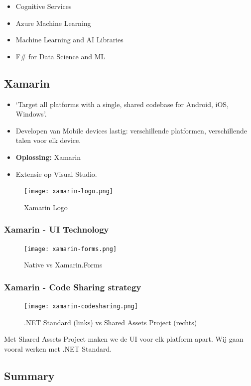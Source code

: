 \documentclass{article}
\newcommand{\bold}[1]{\textbf{#1}}
\begin{document}
\begin{itemize}
    \item Cognitive Services
    \item Azure Machine Learning
    \item Machine Learning and AI Libraries
    \item F\# for Data Science and ML
\end{itemize}

\subsection{Xamarin}
\begin{itemize}
    \item `Target all platforms with a single, shared codebase for Android, iOS, Windows'. 
    \item Developen van Mobile devices lastig: verschillende platformen, verschillende talen voor elk device.
    \item \bold{Oplossing:} Xamarin
    \item Extensie op Visual Studio.
\end{itemize}


\begin{figure}[H]
    \centering
    \texttt{[image: xamarin-logo.png]}
    \caption{Xamarin Logo}
\end{figure}

\subsubsection{Xamarin - UI Technology}
\begin{figure}[H]
    \centering
    \texttt{[image: xamarin-forms.png]}
    \caption{Native vs Xamarin.Forms}
\end{figure}

\subsubsection{Xamarin - Code Sharing strategy}

\begin{figure}[H]
    \centering
    \texttt{[image: xamarin-codesharing.png]}
    \caption{.NET Standard (links) vs Shared Assets Project (rechts)}
\end{figure}

Met Shared Assets Project maken we de UI voor elk platform apart. Wij gaan vooral werken met .NET Standard.


\subsection{Summary}
\end{document}
